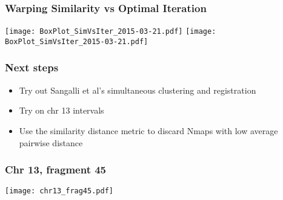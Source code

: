 \documentclass[10pt,dvipsnames,table]{beamer}
\begin{document}
\begin{frame}
\frametitle{Warping Similarity vs Optimal Iteration}
\begin{center}
\texttt{[image: BoxPlot\_SimVsIter\_2015-03-21.pdf]} 
\texttt{[image: BoxPlot\_SimVsIter\_2015-03-21.pdf]} 
\end{center}
\end{frame}

\begin{frame}
\frametitle{Next steps}
\begin{itemize}
\item Try out Sangalli et al's simultaneous clustering and registration
\item Try on chr 13 intervals
\item Use the similarity distance metric to discard Nmaps with low average pairwise distance
\end{itemize}
\end{frame}

\begin{frame}
\frametitle{Chr 13, fragment 45}
\begin{center}
\texttt{[image: chr13\_frag45.pdf]} 
\end{center}
\end{frame}
\end{document}
